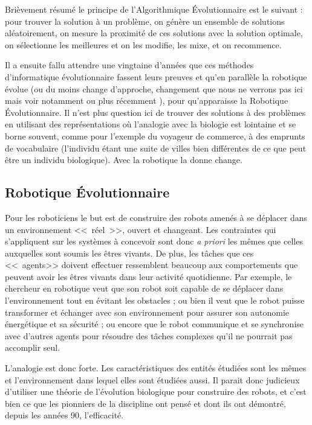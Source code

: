 \documentclass[a4paper,10pt]{article}
\begin{document}
Brièvement résumé le principe de l'Algorithmique \'Evolutionnaire est le suivant : pour trouver la solution à un problème, on génère un ensemble de solutions aléatoirement, on mesure la proximité de ces solutions avec la solution optimale, on sélectionne les meilleures et on les modifie, les mixe, et on recommence.

Il a ensuite fallu attendre une vingtaine d'années que ces méthodes d'informatique évolutionnaire fassent leurs preuves et qu'en parallèle la robotique évolue (ou du moins change d'approche, changement que nous ne verrons pas ici mais voir notamment \citet{brooks91intelligencewithoutreason} ou plus récemment \cite{pfeifer2006howthebodyshapesthewaywethink}), pour qu'apparaisse la Robotique Évolutionnaire. 
Il n'est plus question ici de trouver des solutions à des problèmes en utilisant des représentations où l'analogie avec la biologie est lointaine et se borne souvent, comme pour l'exemple du voyageur de commerce, à des emprunts de vocabulaire (l'individu étant une suite de villes bien différentes de ce que peut être un individu biologique). Avec la robotique la donne change. 

\subsection{Robotique \'Evolutionnaire}\label{sec:re}
Pour les roboticiens le but est de construire des robots amenés à se déplacer dans un environnement <<~réel~>>, ouvert et changeant. Les contraintes qui s'appliquent sur les systèmes à concevoir sont donc \emph{a priori} les mêmes que celles auxquelles sont soumis les êtres vivants. De plus, les t\^{a}ches que ces <<~agents>> doivent effectuer ressemblent beaucoup aux comportements que peuvent avoir les êtres vivants dans leur activité quotidienne. Par exemple, le chercheur en robotique veut que son robot soit capable de se déplacer dans l'environnement tout en évitant les obstacles ; ou bien il veut que le robot puisse transformer et échanger avec son environnement pour assurer son autonomie énergétique et sa sécurité ; ou encore que le robot communique et se synchronise avec d'autres agents pour résoudre des tâches complexes qu'il ne pourrait pas accomplir seul.

L'analogie est donc forte. Les caractéristiques des entités étudiées sont les mêmes et l'environnement dans lequel elles sont étudiées aussi. Il parait donc judicieux d'utiliser une théorie de l'évolution biologique pour construire des robots, et c'est bien ce que les pionniers de la discipline \citep{nolfi00evolrobobiolintetechselfmach} ont pensé et dont ils ont démontré, depuis les années 90, l'efficacité.
\end{document}
